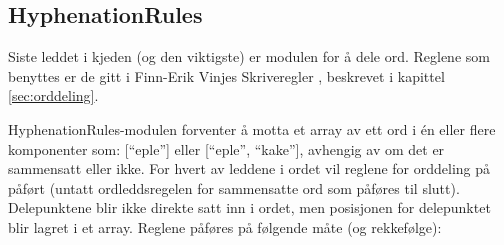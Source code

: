 \subsection{HyphenationRules}

Siste leddet i kjeden (og den viktigste) er modulen for å dele ord. Reglene som benyttes er de gitt i Finn-Erik Vinjes Skriveregler \cite{vinje}, beskrevet i kapittel \ref{sec:orddeling}. 

HyphenationRules-modulen forventer å motta et array av ett ord i én eller flere komponenter som: [“eple”] eller [“eple”, “kake”], avhengig av om det er sammensatt eller ikke. For hvert av  leddene i ordet vil reglene for orddeling på påført (untatt ordleddsregelen for sammensatte ord som påføres til slutt). Delepunktene blir ikke direkte satt inn i ordet, men posisjonen for delepunktet blir lagret i et array. Reglene påføres på følgende måte (og rekkefølge): 
